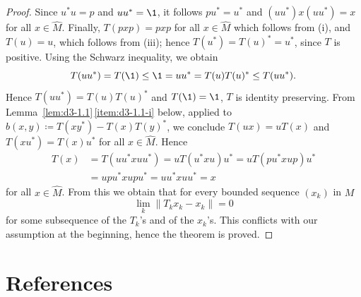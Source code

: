 \begin{proof}
Since $u^{*}u = p$ and $uu^{*} = \1$, it follows $pu^{*} = u^{*}$ and $(uu^{*})x(uu^{*}) = x$ for all $x \in \widehat{M}$.
Finally, $T(pxp) = pxp$ for all $x \in \widehat{M}$ which follows from (i), and $T(u) = u$, which follows from (iii); hence $T(u^{*}) = T(u)^{*} = u^{*}$, since $T$ is positive.
Using the Schwarz inequality, we obtain
\[
	T(uu^{*}) = T(\1) \leq \1 = uu^{*} = T(u)T(u)^{*} \leq T(uu^{*}).
\]
Hence $T(uu^{*}) = T(u)T(u)^{*}$ and $T(\1) = \1$, \ie $T$ is identity preserving.
From Lemma~\ref{lem:d3-1.1}\,\ref{item:d3-1.1-i} below, applied to $b(x,y) \coloneq T(xy^{*}) - T(x)T(y)^{*}$, we conclude $T(ux) = uT(x)$ and $T(xu^{*}) = T(x)u^{*}$ for all $x \in \widehat{M}$.
Hence
\begin{align*}
T(x) &= T(uu^{*}xuu^{*}) = uT(u^{*}xu)u^{*} = uT(pu^{*}xup)u^{*} \\
&= upu^{*}xupu^{*} = uu^{*}xuu^{*} = x
\end{align*}
for all $x \in \widehat{M}$.
From this we obtain that for every bounded sequence $(x_{k})$ in $M$
\[
	\lim_k \|T_k x_{k} - x_{k}\| = 0
\]
for some subsequence of the $T_{k}$'s and of the $x_{k}$'s.
This conflicts with our assumption at the beginning, hence the theorem is proved.
\end{proof}
\section*{References}
{\RaggedRight
  \printbibliography[heading=none]
 }